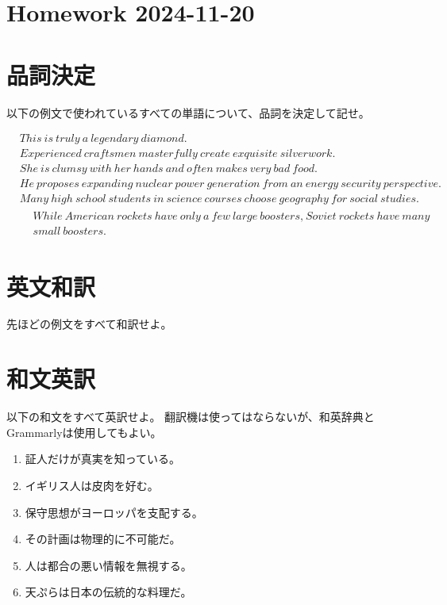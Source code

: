 \documentclass[11pt,a4paper,titlepage]{jsarticle}
\title{}
\author{}
\date{\today}
\begin{document}
\setlength\lineskiplimit{20pt}
\setlength\lineskip{20pt}

\section*{Homework 2024-11-20}

\section{品詞決定}

以下の例文で使われているすべての単語について、品詞を決定して記せ。

\begin{align}
  &This ~ is ~ truly ~ a ~ legendary ~ diamond \text{.}\\
  &Experienced ~ craftsmen ~ masterfully ~ create ~ exquisite ~ silverwork \text{.}\\
  &She ~ is ~ clumsy ~ with ~ her ~ hands ~ and ~ often ~ makes ~ very ~ bad ~ food \text{.}\\
  &He ~ proposes ~ expanding ~ nuclear ~ power ~ generation ~ from ~ an ~ energy ~ security ~ perspective \text{.}\\
  &Many ~ high ~ school ~ students ~ in ~ science ~ courses ~ choose ~ geography ~ for ~ social ~ studies \text{.}\\
  &
  \begin{aligned}
    &While ~ American ~ rockets ~ have ~ only ~ a ~ few ~ large ~ boosters\text{,} ~
    Soviet ~ rockets ~ have ~ many\\ &small ~ boosters\text{.}
  \end{aligned}
\end{align}

\section{英文和訳}

先ほどの例文をすべて和訳せよ。

\section{和文英訳}

以下の和文をすべて英訳せよ。
翻訳機は使ってはならないが、和英辞典とGrammarlyは使用してもよい。

\begin{enumerate}
  \item 証人だけが真実を知っている。\\
  \item イギリス人は皮肉を好む。\\
  \item 保守思想がヨーロッパを支配する。\\
  \item その計画は物理的に不可能だ。\\
  \item 人は都合の悪い情報を無視する。\\
  \item 天ぷらは日本の伝統的な料理だ。
\end{enumerate}
\end{document}
